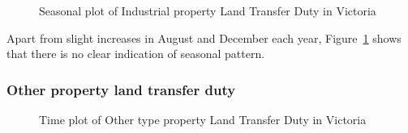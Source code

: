\documentclass[
  11pt,
  a4paper,
]{article}
\begin{document}
\begin{figure}


\caption{\label{fig-indspattern}Seasonal plot of Industrial property
Land Transfer Duty in Victoria}

\end{figure}%

Apart from slight increases in August and December each year,
Figure~\ref{fig-indspattern} shows that there is no clear indication of
seasonal pattern.

\subsubsection{Other property land transfer
duty}\label{other-property-land-transfer-duty}

\begin{figure}


\caption{\label{fig-othertrend}Time plot of Other type property Land
Transfer Duty in Victoria}

\end{figure}%
\end{document}
